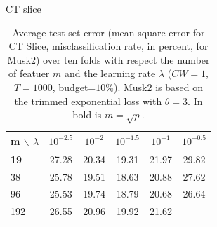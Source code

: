 \documentclass{article}
\begin{document}
\begin{table}[t]
\caption{Average test set error (mean square error for CT Slice, 
misclassification rate, in percent, for Musk2) over ten folds with respect the 
number of featuer $m$ and the learning rate $\lambda$ ($CW=1$, $T=1000$, 
budget=$10\%$). Musk2 is based on the trimmed exponential loss with $\theta=3$. 
In bold is $m=\sqrt{p}$.}
\label{tab:maxFeat}
\begin{center}
\begin{small}
CT slice
\begin{tabular}{l|ccccc}
\hline
m $\backslash$ $\lambda$  &  $10^{-2.5}$ & $10^{-2}$ & $10^{-1.5}$ & 
$10^{-1}$ & $10^{-0.5}$ \\
\hline
{\bf 19} & \cellcolor[gray]{0.59} 27.28 & \cellcolor[gray]{0.92} 20.34 & 
\cellcolor[gray]{0.97} 19.31 & \cellcolor[gray]{0.84} 21.97 & 
\cellcolor[gray]{0.47} 29.82 \\
38 & \cellcolor[gray]{0.66} 25.78 & \cellcolor[gray]{0.96} 19.51 & 
\cellcolor[gray]{1.00} 18.63 & \cellcolor[gray]{0.89} 20.88 & 
\cellcolor[gray]{0.58} 27.62 \\
96 & \cellcolor[gray]{0.68} 25.53 & \cellcolor[gray]{0.95} 19.74 & 
\cellcolor[gray]{0.99} 18.79 & \cellcolor[gray]{0.90} 20.68 & 
\cellcolor[gray]{0.62} 26.64 \\
192 & \cellcolor[gray]{0.63} 26.55 & \cellcolor[gray]{0.89} 20.96 & 
\cellcolor[gray]{0.94} 19.92 & \cellcolor[gray]{0.86} 21.62 & 

\end{tabular}
\end{small}
\end{center}
\end{table}
\end{document}
